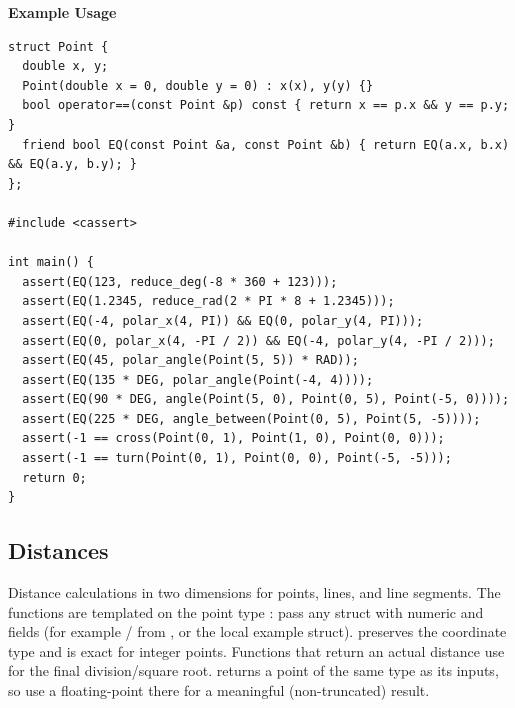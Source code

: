 \textbf{Example Usage}\par
\begin{lstlisting}[style=cpp]
struct Point {
  double x, y;
  Point(double x = 0, double y = 0) : x(x), y(y) {}
  bool operator==(const Point &p) const { return x == p.x && y == p.y; }
  friend bool EQ(const Point &a, const Point &b) { return EQ(a.x, b.x) && EQ(a.y, b.y); }
};

#include <cassert>

int main() {
  assert(EQ(123, reduce_deg(-8 * 360 + 123)));
  assert(EQ(1.2345, reduce_rad(2 * PI * 8 + 1.2345)));
  assert(EQ(-4, polar_x(4, PI)) && EQ(0, polar_y(4, PI)));
  assert(EQ(0, polar_x(4, -PI / 2)) && EQ(-4, polar_y(4, -PI / 2)));
  assert(EQ(45, polar_angle(Point(5, 5)) * RAD));
  assert(EQ(135 * DEG, polar_angle(Point(-4, 4))));
  assert(EQ(90 * DEG, angle(Point(5, 0), Point(0, 5), Point(-5, 0))));
  assert(EQ(225 * DEG, angle_between(Point(0, 5), Point(5, -5))));
  assert(-1 == cross(Point(0, 1), Point(1, 0), Point(0, 0)));
  assert(-1 == turn(Point(0, 1), Point(0, 0), Point(-5, -5)));
  return 0;
}
\end{lstlisting}
\subsection{Distances}
\label{sec:7.2.2}
Distance calculations in two dimensions for points, lines, and line segments. The functions are templated on the point type : pass any struct with numeric  and  fields (for example / from , or the local example struct).  preserves the coordinate type and is exact for integer points. Functions that return an actual distance use  for the final division/square root.  returns a point of the same type as its inputs, so use a floating-point  there for a meaningful (non-truncated) result.

